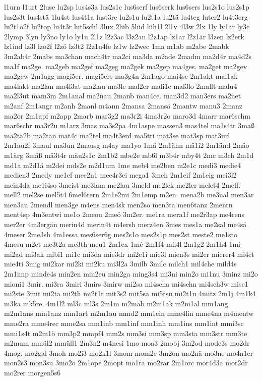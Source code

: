 {l1urn
l1urt
2luse
lu2sp
lus4s3a
lus2s1c
lus6serf
lus6serk
lus6sers
lus2s1o
lus2s1p
lus2s3t
lus4stä
1lu4st
lus4t1a
lust3re
lu2s1u
lu2t1a
lu2tä
lu4teg
luter2
lu4t3erg
lu2t1o2f
lu2top
lu4t3r
lut5schl
3lux
2lüb
5lüd
lüh1l
2l1v
4l3w
2lx
1ly
ly1ar
ly3c
2lymp
3lyn
ly3no
ly1o
ly1u
2l1z
l2z3ac
l3z2an
l2z1ap
lz1ar
l2z1är
l3zen
lz2erk
lz1ind
lz3l
lzo2f
l2zö
lz3t2
l2z1u4fe
lz1w
lz2wec
1ma
m1ab
m2abe
2mabk
3m2ab4r
2mabs
ma3chan
mach4tr
ma2ci
ma3da
m2ade
2madm
ma2d4r
ma4d2s
ma1f
ma2ge.
ma2geb
ma2gef
ma2geg
ma2gek
ma2gep
ma4ges.
ma2get
ma2gev
ma2gew
2m1agg
magi5er.
magi5ers
ma3g4n
2m1ago
mai4se
2m1akt
mal1ak
ma4lakt
ma2lan
ma4l3at
ma2lau
ma3le
mal2er
mali1e
mal3lo
2mallt
malu4
ma2l3ut
mam3m
2m1anal
ma2nau
2manb
man4ce.
man3d2
man3ers
ma2net
m2anf
2m1angr
m2anh
2manl
m4ann
2mansa
2mansä
2mantw
manu3
2manz
ma2or
2m1apf
m2app
2marb
mar3g2
ma3r2i
4ma3r2o
maro3d
4marr
mar6schm
mar6schr
ma3r2u
m1arz
3mas
ma3s2pa
4m1aspe
massen3
mas4tel
ma1s4tr
3maß
ma2ta2b
ma2tan
mat4c
ma2tel
ma4t3erd
ma5tri
mat3se
mat3sp
mat3url
2m1au2f
3maul
ma3un
2mausg
m4ay
ma1yo
1mä
2m1ähn
mä1i2
2m1änd
2mäo
m1ärg
3mäß
mä3t4r
mäu2s1c
2m1b2
mbe2e
mb6l
m3b4r
mby4t
2mc
m3ch
2m1d
md1a
m2d1ä
m2dei
mds2e
m2d1um
1me
meb4
me2ben
m2e1c
medi3
medie4
medien3
2medy
me1ef
mee2n1
mee4r3ei
mega1
3meh
2m1eif
2m1eig
mei3l2
mein4da
me1i4so
3meist
me3lam
me2lau
3meld
me2lek
me2ler
melet4
2melf.
mell2
mel2se
mel5t4
6mel6tern
2m1e2mi
2m1emp
m2en.
mena2b
me3nal
men3ar
men3au
2mendl
men3ge
m4ens
men4sk
men2so
men3ta
men6tanz
2mentn
ment4sp
4m3entwi
me1o
2meou
2meö
3m2er.
me1ra
mera1f
me2r3ap
me4rens
mer2er
4m3ergän
merin4d
merin4t
m4ersh
merz4en
3mes
mes1a
me2sal
me4sä
4meser
2me3sh
4m1essa
mes6ser6g
mes2s1o
mes2s1p
mes2st
meste2
me1sto
4mesu
m2et
me3t2a
me3th
meu1
2m1ex
1mé
2m1f4
mfi4l
2m1g2
2m1h4
1mi
mi2ad
mi3ak
mibi1
mi1c
mi3da
mie3dr
mi2e1i
mie3l
mien3s
mi2er
mierer4
mi4et
mie4ti
3mig
mi2kar
mi2ki
mi2ku
mi3l2a
3milb
3milc
milch1
mil4che
mild4s
2m1imp
minde4s
min2en
min2eu
min2ga
ming3s4
mi3ni
min2o
mi1nu
3minz
mi2o
mioni1
3mir.
mi3ra
3miri
3mirs
3mirw
mi2sa
mi4scha
mi4schn
mi4sch3w
mise1
mi2ste
3mit
mi2ta
mi2th
mi2t1r
mit3s2
mit5sa
mi5tsu
mi2t1u
4mitz
2m1j
4m1k4
m3ka
mk5re.
4m1l2
ml3c
ml3s
2m1m
m2mab
m2m1ak
m2m1al
mm1ang
m2m1ans
mm1anz
mm1art
m2m1au
mmd2
mm1ein
mme4lin
mme4na
m4mentw
mme2ra
mme4rec
mme2sa
mm1inb
mm1inf
mm1inh
mm1ins
mm1int
mmi3sc
mmi1s4t
m2m1ö
mm3p2
mmpf4
mm2s
mm3si
mm3sp
mm3sta
mm3str
mm3te
m2mum
mmül2
mmüll1
2m3n2
m4nesi
1mo
moa3
2mobj
3m2od
mode3s
mo2dr
4mog.
mo2gal
3moh
mo2i3
mo2k1l
3mom
mom2e
3m2on
mo2nä
mo3ne
mo4n1er
mon2s3
mon3su
3mo2o
2m1ope
2mopt
mo1ra
mo2rar
2m1orc
mor4d3a
mor2dr
mo2rer
morgen5s6
}

